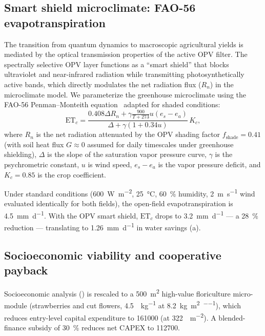 \documentclass[12pt]{iopart}
\begin{document}
\subsection{Smart shield microclimate: FAO-56 evapotranspiration}

The transition from quantum dynamics to macroscopic agricultural yields is mediated by the optical transmission properties of the active OPV filter. The spectrally selective OPV layer functions as a ``smart shield'' that blocks ultraviolet and near-infrared radiation while transmitting photosynthetically active bands, which directly modulates the net radiation flux ($R_n$) in the microclimate model.
We parameterize the greenhouse microclimate using the FAO-56 Penman--Monteith equation~\cite{Allen1998} adapted for shaded conditions:
\begin{equation}
\mathrm{ET}_c = \frac{0.408 \Delta R_n + \gamma \frac{900}{T+273} u (e_s - e_a)}{\Delta + \gamma(1 + 0.34 u)} \, K_c,
\label{eq:fao56}
\end{equation}
where $R_n$ is the net radiation attenuated by the OPV shading factor $f_{\mathrm{shade}} = 0.41$ (with soil heat flux $G \approx 0$ assumed for daily timescales under greenhouse shielding), $\Delta$ is the slope of the saturation vapor pressure curve, $\gamma$ is the psychrometric constant, $u$ is wind speed, $e_s - e_a$ is the vapor pressure deficit, and $K_c = 0.85$ is the crop coefficient.

Under standard conditions (\qty{600}{\W\per\m\squared}, \qty{25}{\celsius}, \qty{60}{\percent} humidity, \qty{2}{\m\per\s} wind evaluated identically for both fields), the open-field evapotranspiration is \qty{4.5}{\mm\per\day}.
With the OPV smart shield, $\mathrm{ET}_c$ drops to \qty{3.2}{\mm\per\day} --- a \qty{28}{\percent} reduction --- translating to \qty{1.26}{\mm\per\day} in water savings (a).

\subsection{Socioeconomic viability and cooperative payback}

Socioeconomic analysis () is rescaled to a \qty{500}{\m\squared} high-value floriculture micro-module (strawberries and cut flowers, \qty{4.5}{\USD\per\kg} at \qty{8.2}{\kg\per\m\squared\per\yr}), which reduces entry-level capital expenditure to \qty{161000}{\USD} (at \qty{322}{\USD\per\m\squared}).
A blended-finance subsidy of \qty{30}{\percent} reduces net CAPEX to \qty{112700}{\USD}.
\end{document}
